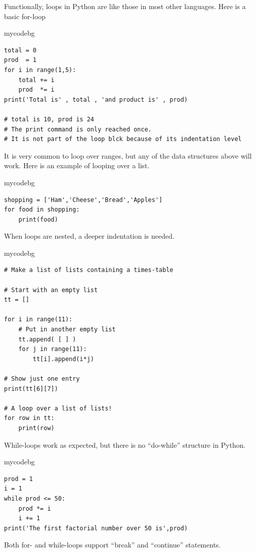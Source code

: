Functionally, loops in Python are like those in most other languages.
Here is a basic for-loop
\begin{tsession}{mycodebg}
\begin{verbatim}
total = 0
prod  = 1
for i in range(1,5):
    total += i
    prod  *= i
print('Total is' , total , 'and product is' , prod)

# total is 10, prod is 24
# The print command is only reached once.
# It is not part of the loop blck because of its indentation level
\end{verbatim}
\end{tsession}
It is very common to loop over ranges, but any of the data structures above will work.
Here is an example of looping over a list.
\begin{tsession}{mycodebg}
\begin{verbatim}
shopping = ['Ham','Cheese','Bread','Apples']
for food in shopping:
    print(food)
\end{verbatim}
\end{tsession}
When loops are nested, a deeper indentation is needed.
\begin{tsession}{mycodebg}
\begin{verbatim}
# Make a list of lists containing a times-table

# Start with an empty list
tt = []

for i in range(11):
    # Put in another empty list
    tt.append( [ ] )
    for j in range(11):
        tt[i].append(i*j)

# Show just one entry
print(tt[6][7])

# A loop over a list of lists!
for row in tt:
    print(row)
\end{verbatim}
\end{tsession}
While-loops work as expected,
but there is no ``do-while'' structure in Python.
\begin{tsession}{mycodebg}
\begin{verbatim}
prod = 1
i = 1
while prod <= 50:
    prod *= i
    i += 1
print('The first factorial number over 50 is',prod)
\end{verbatim}
\end{tsession}
Both for- and while-loops support ``break'' and ``continue'' statements.
